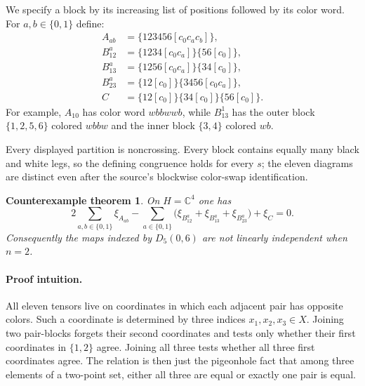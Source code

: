\documentclass[10pt]{article}
\newtheorem*{theorem}{Counterexample theorem}
\newcommand{\C}{\mathbb C}
\newcommand{\xiP}{\xi}
\begin{document}
We specify a block by its increasing list of positions followed by its color
word.  For $a,b\in\{0,1\}$ define:
\begin{align*}
 A_{ab}&=\{123456[c_0c_ac_b]\},\\
 B_{12}^{a}&=\{1234[c_0c_a]\}\{56[c_0]\},\\
 B_{13}^{a}&=\{1256[c_0c_a]\}\{34[c_0]\},\\
 B_{23}^{a}&=\{12[c_0]\}\{3456[c_0c_a]\},\\
 C&=\{12[c_0]\}\{34[c_0]\}\{56[c_0]\}.
\end{align*}
For example, $A_{10}$ has color word $wbbwwb$, while $B_{13}^1$
has the outer block $\{1,2,5,6\}$ colored $wbbw$ and the inner block
$\{3,4\}$ colored $wb$.

Every displayed partition is noncrossing.  Every block contains equally many
black and white legs, so the defining congruence holds for every $s$; the
eleven diagrams are distinct even after the source's blockwise color-swap
identification.

\begin{theorem}
On $H=\C^4$ one has
\begin{equation}\label{eq:relation}
 2\sum_{a,b\in\{0,1\}}\xiP_{A_{ab}}
 -\sum_{a\in\{0,1\}}
   \bigl(\xiP_{B_{12}^{a}}+\xiP_{B_{13}^{a}}+\xiP_{B_{23}^{a}}\bigr)
 +\xiP_C=0.
\end{equation}
Consequently the maps indexed by $D_5(0,6)$ are not linearly independent
when $n=2$.
\end{theorem}

\paragraph{Proof intuition.}
All eleven tensors live on coordinates in which each adjacent pair has
opposite colors.  Such a coordinate is determined by three indices
$x_1,x_2,x_3\in X$.  Joining two pair-blocks forgets their second coordinates
and tests only whether their first coordinates in $\{1,2\}$ agree.  Joining
all three tests whether all three first coordinates agree.  The relation is
then just the pigeonhole fact that among three elements of a two-point set,
either all three are equal or exactly one pair is equal.
\end{document}
